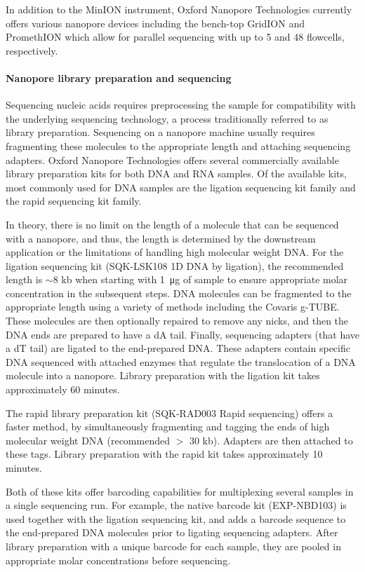 In addition to the MinION instrument, Oxford Nanopore Technologies
currently offers various nanopore devices including the bench-top
GridION and PromethION which allow for parallel sequencing with up to 5
and 48 flowcells, respectively.


\paragraph{Nanopore library preparation and sequencing}
Sequencing nucleic acids requires preprocessing the sample for
compatibility with the underlying sequencing technology, a process
traditionally referred to as library preparation.
%
Sequencing on a nanopore machine usually requires fragmenting these
molecules to the appropriate length and attaching sequencing adapters.
%
Oxford Nanopore Technologies offers several commercially available
library preparation kits for both DNA and RNA samples.  Of the available
kits, most commonly used for DNA samples are the ligation sequencing kit
family and the rapid sequencing kit family.

In theory, there is no limit on the length of a molecule that can be
sequenced with a nanopore, and thus, the length is determined by the
downstream application or the limitations of handling high molecular
weight DNA. For the ligation sequencing kit (SQK-LSK108 1D DNA by
ligation), the recommended length is $\sim$8 kb when starting with
\SI{1}{\micro\gram} of sample to ensure appropriate molar concentration
in the subsequent steps.  DNA molecules can be fragmented to the
appropriate length using a variety of methods including the Covaris
g-TUBE.
%
These molecules are then optionally repaired to remove any nicks, and
then the DNA ends are prepared to have a dA tail. Finally, sequencing
adapters (that have a dT tail) are ligated to the end-prepared DNA.
These adapters contain specific DNA sequenced with attached enzymes that
regulate the translocation of a DNA molecule into a nanopore.  Library
preparation with the ligation kit takes approximately 60 minutes.

The rapid library preparation kit (SQK-RAD003 Rapid sequencing) offers a
faster method, by simultaneously fragmenting and tagging the ends of
high molecular weight DNA (recommended $>$ 30 kb). Adapters are then
attached to these tags.  Library preparation with the rapid kit takes
approximately 10 minutes.

Both of these kits offer barcoding capabilities for multiplexing several
samples in a single sequencing run. For example, the native barcode kit
(EXP-NBD103) is used together with the ligation sequencing kit, and
adds a barcode sequence to the end-prepared DNA molecules prior to
ligating sequencing adapters. After library preparation with a unique
barcode for each sample, they are pooled in appropriate molar
concentrations before sequencing.

